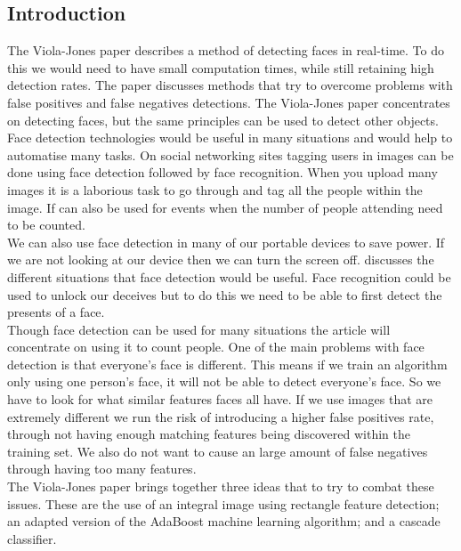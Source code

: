 \documentclass[10pt,a4paper,openbib]{article}
\begin{document}
\begin{multicols}{2}
\section{Introduction}
The Viola-Jones paper\cite{violaJones} describes a method of detecting faces in real-time. To do this we would need to have small computation times, while still retaining high detection rates. The paper\cite{violaJones} discusses methods that try to overcome problems with false positives and false negatives detections. The Viola-Jones paper\cite{violaJones} concentrates on detecting faces, but the same principles can be used to detect other objects. \\

\noindent Face detection technologies would be useful in many situations and would help to automatise many tasks. On social networking sites tagging users in images can be done using face detection followed by face recognition. When you upload many images it is a laborious task to go through and tag all the people within the image. If can also be used for events when the number of people attending need to be counted. \\

\noindent We can also use face detection in many of our portable devices to save power. If we are not looking at our device then we can turn the screen off. \cite{exampleUse} discusses the different situations that face detection would be useful. Face recognition could be used to unlock our deceives but to do this we need to be able to first detect the presents of a face. \\

\noindent Though face detection can be used for many situations the article will concentrate on using it to count people. One of the main problems with face detection is that everyone's face is different. This means if we train an algorithm only using one person's face, it will not be able to detect everyone's face. So we have to look for what similar features faces all have. If we use images that are extremely different we run the risk of introducing a higher false positives rate, through not having enough matching features being discovered within the training set. We also do not want to cause an large amount of false negatives through having too many features. \\

\noindent The Viola-Jones paper\cite{violaJones} brings together three ideas that to try to combat these issues. These are the use of an integral image using rectangle feature detection; an adapted version of the AdaBoost machine learning algorithm; and a cascade classifier. \\


\end{multicols}
\end{document}
